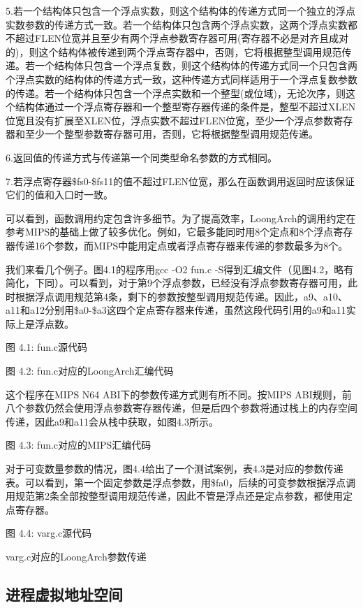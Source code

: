 \documentclass[]{ctexbook}
\begin{document}
5.若一个结构体只包含一个浮点实数，则这个结构体的传递方式同一个独立的浮点实数参数的传递方式一致。若一个结构体只包含两个浮点实数，这两个浮点实数都不超过FLEN位宽并且至少有两个浮点参数寄存器可用(寄存器不必是对齐且成对的)，则这个结构体被传递到两个浮点寄存器中，否则，它将根据整型调用规范传递。若一个结构体只包含一个浮点复数，则这个结构体的传递方式同一个只包含两个浮点实数的结构体的传递方式一致，这种传递方式同样适用于一个浮点复数参数的传递。若一个结构体只包含一个浮点实数和一个整型(或位域)，无论次序，则这个结构体通过一个浮点寄存器和一个整型寄存器传递的条件是，整型不超过XLEN位宽且没有扩展至XLEN位，浮点实数不超过FLEN位宽，至少一个浮点参数寄存器和至少一个整型参数寄存器可用，否则，它将根据整型调用规范传递。

6.返回值的传递方式与传递第一个同类型命名参数的方式相同。

7.若浮点寄存器\$fs0-\$fs11的值不超过FLEN位宽，那么在函数调用返回时应该保证它们的值和入口时一致。

可以看到，函数调用约定包含许多细节。为了提高效率，LoongArch的调用约定在参考MIPS的基础上做了较多优化。例如，它最多能同时用8个定点和8个浮点寄存器传递16个参数，而MIPS中能用定点或者浮点寄存器来传递的参数最多为8个。

我们来看几个例子。图4.1的程序用gcc -O2 fun.c -S得到汇编文件（见图4.2，略有简化，下同）。可以看到，对于第9个浮点参数，已经没有浮点参数寄存器可用，此时根据浮点调用规范第4条，剩下的参数按整型调用规范传递。因此，a9、a10、a11和a12分别用\$a0-\$a3这四个定点寄存器来传递，虽然这段代码引用的a9和a11实际上是浮点数。

图 4.1: fun.c源代码

图 4.2: fun.c对应的LoongArch汇编代码

这个程序在MIPS N64 ABI下的参数传递方式则有所不同。按MIPS ABI规则，前八个参数仍然会使用浮点参数寄存器传递，但是后四个参数将通过栈上的内存空间传递，因此a9和a11会从栈中获取，如图4.3所示。

图 4.3: fun.c对应的MIPS汇编代码

对于可变数量参数的情况，图4.4给出了一个测试案例，表4.3是对应的参数传递表。可以看到，第一个固定参数是浮点参数，用\$fa0，后续的可变参数根据浮点调用规范第2条全部按整型调用规范传递，因此不管是浮点还是定点参数，都使用定点寄存器。

图 4.4: varg.c源代码

\label{tab:varg-passing}varg.c对应的LoongArch参数传递

\hypertarget{ux8fdbux7a0bux865aux62dfux5730ux5740ux7a7aux95f4}{%
\subsection{进程虚拟地址空间}\label{ux8fdbux7a0bux865aux62dfux5730ux5740ux7a7aux95f4}}
\end{document}

